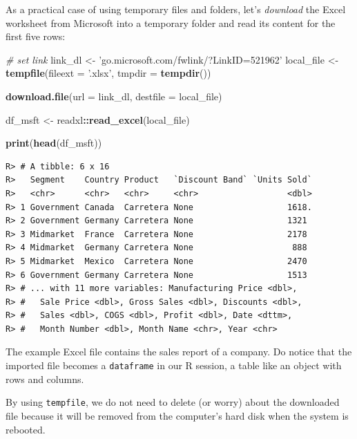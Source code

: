 \documentclass[
  12pt,
]{book}
\newenvironment{Shaded}{\begin{snugshade}}{\end{snugshade}}
\newcommand{\CommentTok}[1]{\textcolor[rgb]{0.37,0.37,0.37}{\textit{#1}}}
\newcommand{\DataTypeTok}[1]{\textcolor[rgb]{0.27,0.27,0.27}{#1}}
\newcommand{\KeywordTok}[1]{\textcolor[rgb]{0.27,0.27,0.27}{\textbf{#1}}}
\newcommand{\NormalTok}[1]{#1}
\newcommand{\OperatorTok}[1]{\textcolor[rgb]{0.43,0.43,0.43}{\textbf{#1}}}
\newcommand{\StringTok}[1]{\textcolor[rgb]{0.5,0.5,0.5}{#1}}
\begin{document}
As a practical case of using temporary files and folders, let's \emph{download} the Excel worksheet from Microsoft into a temporary folder and read its content for the first five rows:

\begin{Shaded}
\begin{Highlighting}[]
\CommentTok{# set link}
\NormalTok{link_dl <-}\StringTok{ 'go.microsoft.com/fwlink/?LinkID=521962'}
\NormalTok{local_file <-}\StringTok{ }\KeywordTok{tempfile}\NormalTok{(}\DataTypeTok{fileext =} \StringTok{'.xlsx'}\NormalTok{, }\DataTypeTok{tmpdir =} \KeywordTok{tempdir}\NormalTok{())}

\KeywordTok{download.file}\NormalTok{(}\DataTypeTok{url =}\NormalTok{ link_dl,}
              \DataTypeTok{destfile =}\NormalTok{ local_file)}

\NormalTok{df_msft <-}\StringTok{ }\NormalTok{readxl}\OperatorTok{::}\KeywordTok{read_excel}\NormalTok{(local_file)}

\KeywordTok{print}\NormalTok{(}\KeywordTok{head}\NormalTok{(df_msft))}
\end{Highlighting}
\end{Shaded}

\begin{verbatim}
R> # A tibble: 6 x 16
R>   Segment    Country Product   `Discount Band` `Units Sold`
R>   <chr>      <chr>   <chr>     <chr>                  <dbl>
R> 1 Government Canada  Carretera None                   1618.
R> 2 Government Germany Carretera None                   1321 
R> 3 Midmarket  France  Carretera None                   2178 
R> 4 Midmarket  Germany Carretera None                    888 
R> 5 Midmarket  Mexico  Carretera None                   2470 
R> 6 Government Germany Carretera None                   1513 
R> # ... with 11 more variables: Manufacturing Price <dbl>,
R> #   Sale Price <dbl>, Gross Sales <dbl>, Discounts <dbl>,
R> #   Sales <dbl>, COGS <dbl>, Profit <dbl>, Date <dttm>,
R> #   Month Number <dbl>, Month Name <chr>, Year <chr>
\end{verbatim}

The example Excel file contains the sales report of a company. Do notice that the imported file becomes a \texttt{dataframe} in our R session, a table like an object with rows and columns.

By using \texttt{tempfile}, we do not need to delete (or worry) about the downloaded file because it will be removed from the computer's hard disk when the system is rebooted.
\end{document}
